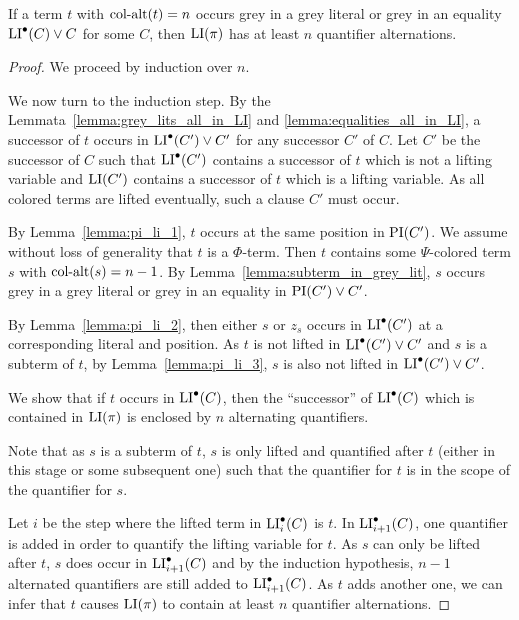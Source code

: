 \documentclass[,%
	draft=false,%
	numbers=noendperiod
	12pt,
	a4paper,
	oneside,%
	openany,
]{memoir}
\begin{document}
\begin{clemma}
	If a term $t$ with $\operatorname{col-alt}(t)=n$ occurs grey in a grey literal or grey in an equality $\operatorname{LI}^\bullet(C) \lor C$ for some $C$, then $\operatorname{LI}(\pi)$ has at least $n$ quantifier alternations.
\end{clemma}
\begin{proof}
	We proceed by induction over $n$.


	We now turn to the induction step.
	By the Lemmata~\ref{lemma:grey_lits_all_in_LI} and \ref{lemma:equalities_all_in_LI}, a successor of $t$ occurs in $\operatorname{LI}^\bullet(C') \lor C'$ for any successor $C'$ of $C$.
	Let $C'$ be the successor of $C$ such that $\operatorname{LI}^\bullet(C')$ contains a successor of $t$ which is not a lifting variable and $\operatorname{LI}(C')$ contains a successor of $t$ which is a lifting variable.
	As all colored terms are lifted eventually, such a clause $C'$ must occur.

	By Lemma~\ref{lemma:pi_li_1}, $t$ occurs at the same position in $\operatorname{PI}(C')$.
	We assume without loss of generality that $t$ is a $\Phi$-term.
	Then $t$ contains some $\Psi$-colored term $s$ with $\operatorname{col-alt}(s) = n-1$.
	By Lemma~\ref{lemma:subterm_in_grey_lit}, $s$ occurs grey in a grey literal or grey in an equality in $\operatorname{PI}(C')\lor C'$.

	By Lemma~\ref{lemma:pi_li_2}, then either $s$ or $z_s$ occurs in $\operatorname{LI}^\bullet(C')$ at a corresponding literal and position. 
	As $t$ is not lifted in $\operatorname{LI}^\bullet(C') \lor C'$ and $s$ is a subterm of $t$, by Lemma~\ref{lemma:pi_li_3}, $s$ is also not lifted in $\operatorname{LI}^\bullet(C') \lor C'$.

	We show that if $t$ occurs in $\operatorname{LI}^\bullet(C)$, then the ``successor'' of $\operatorname{LI}^\bullet(C)$ which is contained in $\operatorname{LI}(\pi)$ is enclosed by $n$ alternating quantifiers. 

	Note that as $s$ is a subterm of $t$, $s$ is only lifted and quantified after $t$ (either in this stage or some subsequent one) such that the quantifier for $t$ is in the scope of the quantifier for $s$. 

	Let $i$ be the step where the lifted term in  $\operatorname{LI}^\bullet_i(C)$ is $t$.
	In $\operatorname{LI}^\bullet_{i+1}(C)$, one quantifier is added in order to quantify the lifting variable for $t$.
	As $s$ can only be lifted after $t$, $s$ does occur in $\operatorname{LI}^\bullet_{i+1}(C)$ and by the induction hypothesis, $n-1$ alternated quantifiers are still added to $\operatorname{LI}^\bullet_{i+1}(C)$.
	As $t$ adds another one, we can infer that $t$ causes $\operatorname{LI}(\pi)$ to contain at least $n$ quantifier alternations.
\end{proof}
\end{document}
